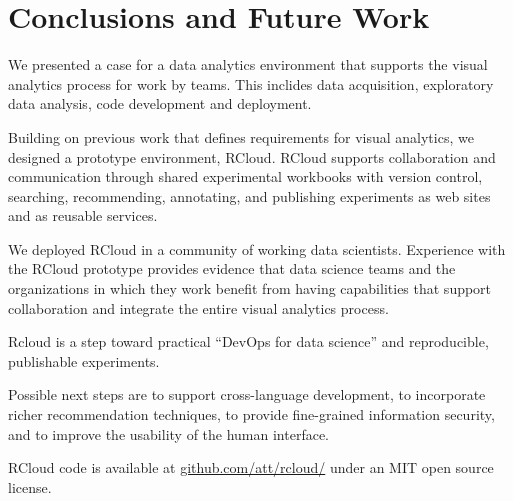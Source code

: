 \section{Conclusions and Future Work}

We presented a case for a data analytics environment that
supports the visual analytics process for work by teams.
This inclides data acquisition, exploratory data analysis,
code development and deployment.

Building on previous work that defines requirements for
visual analytics, we designed a prototype environment, RCloud.
RCloud supports collaboration and communication
through shared experimental workbooks with version
control, searching, recommending, annotating, and publishing
experiments as web sites and as reusable services. 

We deployed RCloud in a community of working data scientists.
Experience with the RCloud prototype provides evidence that data
science teams and the organizations in which they work benefit from
having capabilities that support collaboration and integrate
the entire visual analytics process.

Rcloud is a step toward practical ``DevOps for data science'' and
reproducible, publishable experiments.

Possible next steps are to support cross-language development,
to incorporate richer recommendation techniques, to provide fine-grained
information security, and to improve the usability of the human interface.

RCloud code is available at \url{github.com/att/rcloud/}
under an MIT open source license.
